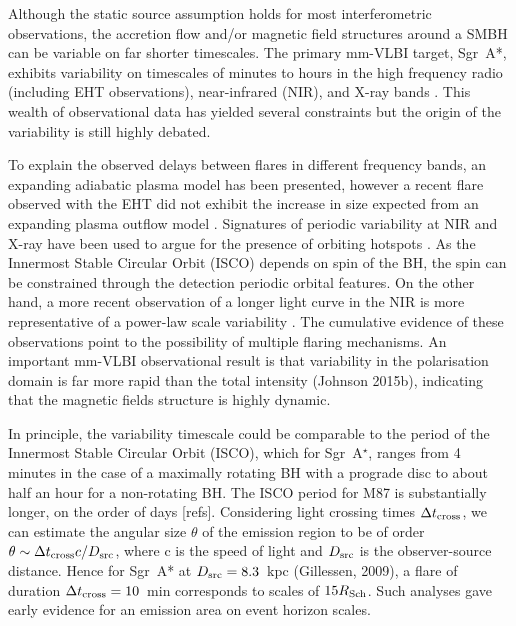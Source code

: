 Although the static source assumption holds for most interferometric observations, the accretion flow and/or magnetic field structures around a SMBH can be variable on far shorter timescales. The primary mm-VLBI target, Sgr~A*,  exhibits variability on timescales of minutes to hours in the high frequency radio (including EHT observations), near-infrared (NIR), and X-ray bands \citep[e.g.][]{Baganoff_2001, Genzel_2003, Yusef-Zadeh_2006, Maronne_2006, Fish_2011, Johnson_2015b}. This wealth of observational data has yielded several constraints but the origin of the variability is still highly debated.


To explain the observed delays between flares in different frequency bands, an expanding adiabatic plasma model \citep[e.g.][]{Marrone_2008} has been presented, however a recent flare observed with the EHT did not exhibit the increase in size expected from an expanding plasma outflow model \cite{Fish_2011}.  Signatures of periodic variability at NIR and X-ray \citep{Genzel_2003,Belanger_2006} have been used to argue for the presence of orbiting hotspots \cite{Doeleman_2009}. As the Innermost Stable Circular Orbit (ISCO) depends on spin of the BH, the spin can be constrained through the detection periodic orbital features. On the other hand, a more recent observation of a longer light curve in the NIR is more representative of a power-law scale variability \cite{Meyer_2008}. The cumulative evidence of these observations point to the possibility of multiple flaring mechanisms. An important mm-VLBI observational result is that variability in the polarisation domain is far more rapid than the total intensity (Johnson 2015b), indicating that the magnetic fields structure is highly dynamic.


In principle, the variability timescale could be comparable to the period of the Innermost Stable Circular Orbit (ISCO), which for Sgr~A$^\star$, ranges from 4 minutes in the case of a maximally rotating BH with a prograde disc to about half an hour for a non-rotating BH. The ISCO period for M87 is substantially longer, on the order of days [refs]. Considering light crossing times $\Delta t_{\rm cross}$, we can estimate the angular size $\theta$ of the emission region to be of order $\theta \sim \Delta t_{\rm cross} c /D_{\rm src}$, where c is the speed of light and $D_{\rm src}$ is the observer-source distance. Hence for Sgr~A* at $D_{\rm src} = 8.3$~kpc (Gillessen, 2009), a flare of duration $ \Delta t_{\rm cross} =10$~min corresponds to scales of  $15 R_{\rm Sch}$. Such analyses gave early evidence for an emission area on event horizon scales.


